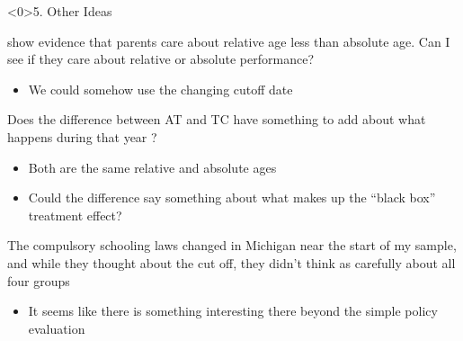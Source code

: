 \documentclass[t,aspectratio=169,11pt,presentation]{beamer}
\begin{document}
\begin{frame}<0>{5. Other Ideas}

\citet{cook2018school} show evidence that parents care about relative age less than absolute age. Can I see if they care about relative or absolute performance?
    \begin{itemize}
        \item We could somehow use the changing cutoff date
    \end{itemize}

\vspace{12pt}    
    
Does the difference between AT and TC have something to add about what happens during that year ?
    \begin{itemize}
        \item Both are the same relative and absolute ages
        \item Could the difference say something about what makes up the ``black box'' treatment effect?
    \end{itemize}

\vspace{12pt}
The compulsory schooling laws changed in Michigan near the start of my sample, and while they thought about the cut off, they didn't think as carefully about all four groups
\begin{itemize}
    \item It seems like there is something interesting there beyond the simple policy evaluation
\end{itemize}

\vspace{12pt}

\hyperlink{nextsteps}{}

\end{frame}
\end{document}
